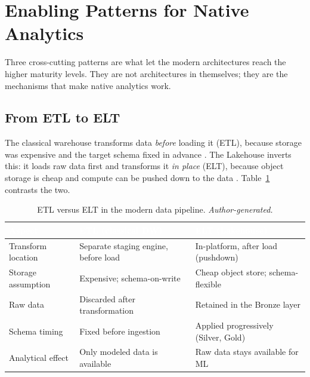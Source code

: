 \section{Enabling Patterns for Native Analytics}
\label{sec:ch2-patterns}

Three cross-cutting patterns are what let the modern architectures reach the higher maturity levels. They are not architectures in themselves; they are the mechanisms that make native analytics work.

\subsection{From ETL to ELT}
\label{subsec:ch2-elt}

The classical warehouse transforms data \emph{before} loading it (ETL), because storage was expensive and the target schema fixed in advance \parencite{vassiliadis2009}. The Lakehouse inverts this: it loads raw data first and transforms it \emph{in place} (ELT), because object storage is cheap and compute can be pushed down to the data \parencite{harby2024}. Table~\ref{tab:etl-vs-elt} contrasts the two.

\begin{table}[H]
\centering
\renewcommand{\arraystretch}{1.35}
\caption{ETL versus ELT in the modern data pipeline. \textit{Author-generated.}}
\label{tab:etl-vs-elt}
\begin{tabularx}{\linewidth}{|>{\raggedright\arraybackslash}p{3.0cm}|>{\raggedright\arraybackslash}X|>{\raggedright\arraybackslash}X|}
\hline
\rowcolor{tblheader}
\textcolor{white}{\textbf{Aspect}} &
\textcolor{white}{\textbf{ETL (classical DW)}} &
\textcolor{white}{\textbf{ELT (Lakehouse)}} \\
\hline
Transform location & Separate staging engine, before load & In-platform, after load (pushdown) \\
Storage assumption & Expensive; schema-on-write & Cheap object store; schema-flexible \\
Raw data & Discarded after transformation & Retained in the Bronze layer \\
Schema timing & Fixed before ingestion & Applied progressively (Silver, Gold) \\
Analytical effect & Only modeled data is available & Raw data stays available for ML \\
\hline
\end{tabularx}
\end{table}

